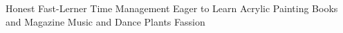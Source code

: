 

\begin{cvskills}
 {
  Honest \mitdiv Fast-Lerner \mitdiv Time Management \mitdiv Eager to Learn
}
 {
  Acrylic Painting \mitdiv Books and Magazine \mitdiv Music and Dance
}
 {
  Plants \mitdiv Fassion
}
\end{cvskills}
